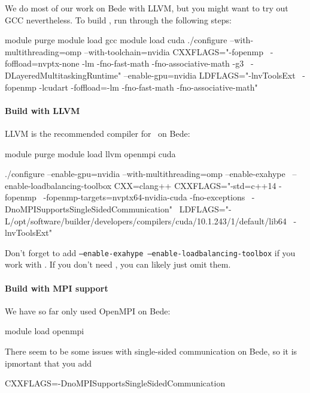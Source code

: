 We do most of our work on Bede with LLVM, but you might want to try out GCC
nevertheless.
To build \Peano, run through the following steps:


\begin{code}
module purge
module load gcc
module load cuda
./configure --with-multithreading=omp --with-toolchain=nvidia CXXFLAGS="-fopenmp \ 
  -foffload=nvptx-none -lm -fno-fast-math -fno-associative-math -g3 \
  -DLayeredMultitaskingRuntime" --enable-gpu=nvidia  LDFLAGS="-lnvToolsExt \
  -fopenmp -lcudart -foffload=-lm -fno-fast-math -fno-associative-math"
\end{code}




\paragraph{Build with LLVM}

LLVM is the recommended compiler for \Peano\ on Bede:

\begin{code}
module purge
module load llvm openmpi cuda

./configure --enable-gpu=nvidia --with-multithreading=omp --enable-exahype \  
  --enable-loadbalancing-toolbox CXX=clang++ CXXFLAGS="-std=c++14 -fopenmp \
  -fopenmp-targets=nvptx64-nvidia-cuda -fno-exceptions \
  -DnoMPISupportsSingleSidedCommunication"  \
  LDFLAGS="-L/opt/software/builder/developers/compilers/cuda/10.1.243/1/default/lib64 \ 
  -lnvToolsExt"
\end{code}


\noindent
Don't forget to add \texttt{--enable-exahype --enable-loadbalancing-toolbox} if
you work with \ExaHyPE.
If you don't need \ExaHyPE, you can likely just omit them.


\paragraph{Build with MPI support}

We have so far only used OpenMPI on Bede:
\begin{code}
module load openmpi
\end{code}

\noindent
There seem to be some issues with single-sided communication on Bede, so it is
ipmortant that you add

\begin{code}
CXXFLAGS=-DnoMPISupportsSingleSidedCommunication
\end{code}

